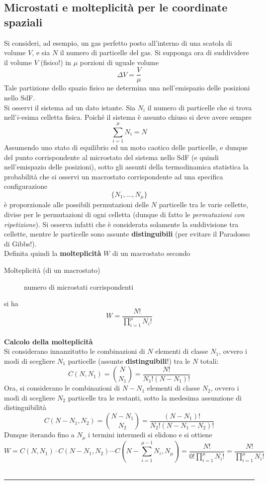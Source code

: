 \documentclass[10pt, oneside]{book}
\newcommand{\infobox}[2]{\vspace{0.5cm}~\\ \textbf{#1} \hrulefill \vspace{0.2cm}\\#2 {}\,\\\hrule \vspace{0.5cm}}
\newcommand{\ds}{\displaystyle}
\begin{document}
\subsection{Microstati e molteplicità per le coordinate spaziali}
Si consideri, ad esempio, un gas perfetto posto all'interno di una scatola di volume $V$, e sia $N$ il numero di particelle del gas. Si supponga ora di suddividere il volume $V$ (fisico!) in $\mu$ porzioni di uguale volume
\[ \Delta V = \frac{V}{\mu}\]
Tale partizione dello spazio fisico ne determina una nell'emispazio delle posizioni nello SdF.\\
Si osservi il sistema ad un dato istante. Sia $N_i$ il numero di particelle che si trova nell'$i$-esima celletta fisica. Poiché il sistema è assunto chiuso si deve avere sempre
\[\sum\limits_{i=1}^\mu N_i = N\]
Assumendo uno stato di equilibrio ed un moto caotico delle particelle, e dunque del punto corrispondente al microstato del sistema nello SdF (e quindi nell'emispazio delle posizioni), sotto gli assunti della termodinamica statistica la probabilità che si osservi un macrostato corrispondente ad una specifica configurazione
\[\{N_1, ..., N_\mu\}\]
è proporzionale alle possibili permutazioni delle $N$ particelle tra le varie cellette, divise per le permutazioni di ogni celletta (dunque di fatto le \textit{permutazioni con ripetizione}). Si osserva infatti che è considerata solamente la suddivisione tra cellette, mentre le particelle sono assunte \textbf{distinguibili} (per evitare il Paradosso di Gibbs!).\\
Definita quindi la \textbf{molteplicità} $W$ di un macrostato secondo
\begin{description}
\item[Molteplicità (di un macrostato)] numero di microstati corrispondenti
\end{description}
si ha
\[W = \frac{N!}{\ds \prod_{i=1}^\mu N_i!}\]
\infobox{Calcolo della molteplicità}{
Si considerano innanzitutto le combinazioni di $N$ elementi di classe $N_1$, ovvero i modi di scegliere $N_1$ particelle (assunte \textbf{distinguibili}!) tra le $N$ totali:
\[C(N, N_1) = \binom{N}{N_1} = \frac{N!}{N_1! (N-N_1)!}\]
Ora, si considerano le combinazioni di $N-N_1$ elementi di classe $N_2$, ovvero i modi di scegliere $N_2$ particelle tra le restanti, sotto la medesima assunzione di distinguibilità
\[C(N-N_1, N_2) = \binom{N-N_1}{N_2} = \frac{(N-N_1)!}{N_2! (N-N_1-N_2)!}\]
Dunque iterando fino a $N_\mu$ i termini intermedi si elidono e si ottiene
\[W = C(N, N_1) \cdot C(N-N_1, N_2) \cdots C(N- \sum_{i=1}^{\mu - 1} N_i, N_\mu) = \frac{N!}{0! \prod_{i=1}^\mu N_i !} = \frac{N!}{\prod_{i=1}^\mu N_i !}\]
}
\end{document}
